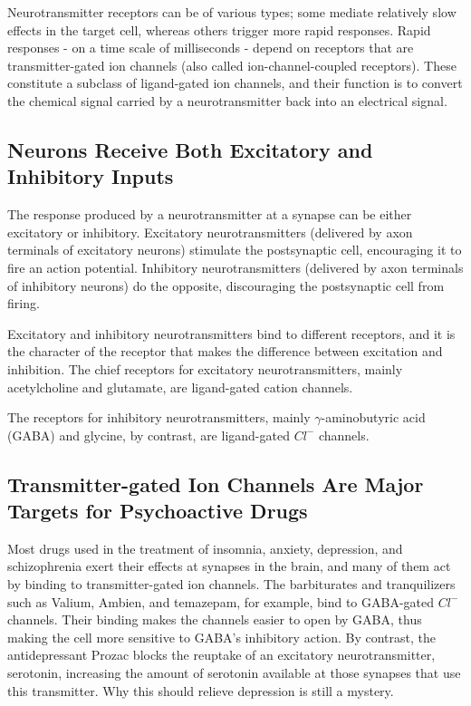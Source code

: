 Neurotransmitter receptors can be of various types; some mediate relatively
slow effects in the target cell, whereas others trigger more rapid
responses. Rapid responses - on a time scale of milliseconds - depend
on receptors that are transmitter-gated ion channels (also called ion-channel-coupled
receptors). These constitute a subclass of ligand-gated ion
channels, and their function is to convert the chemical signal carried by a
neurotransmitter back into an electrical signal.

\subsection{Neurons Receive Both Excitatory and Inhibitory Inputs}

The response produced by a neurotransmitter at a synapse can be either
excitatory or inhibitory. Excitatory neurotransmitters (delivered by axon
terminals of excitatory neurons) stimulate the postsynaptic cell, encouraging
it to fire an action potential. Inhibitory neurotransmitters (delivered
by axon terminals of inhibitory neurons) do the opposite, discouraging
the postsynaptic cell from firing.

Excitatory and inhibitory neurotransmitters bind to different receptors,
and it is the character of the receptor that makes the difference between
excitation and inhibition. The chief receptors for excitatory neurotransmitters,
mainly acetylcholine and glutamate, are ligand-gated cation
channels.

The receptors for inhibitory neurotransmitters, mainly $\gamma$-aminobutyric acid (GABA)
and glycine, by contrast, are ligand-gated $Cl^{-}$ channels.

\subsection{Transmitter-gated Ion Channels Are Major Targets for Psychoactive Drugs}

Most drugs used in the treatment of insomnia, anxiety, depression, and
schizophrenia exert their effects at synapses in the brain, and many of
them act by binding to transmitter-gated ion channels. The barbiturates
and tranquilizers such as Valium, Ambien, and temazepam, for example,
bind to GABA-gated $Cl^{-}$ channels. Their binding makes the channels easier
to open by GABA, thus making the cell more sensitive to GABA’s inhibitory
action. By contrast, the antidepressant Prozac blocks the reuptake
of an excitatory neurotransmitter, serotonin, increasing the amount of
serotonin available at those synapses that use this transmitter. Why this
should relieve depression is still a mystery.

